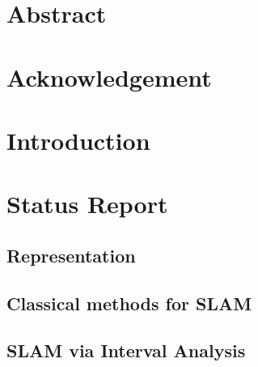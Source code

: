 \documentclass[12pt]{report} %
\begin{document}
\renewcommand{\contentsname}{Contents}	%
\renewcommand{\bibname}{Bibliography}	%




\chapter*{Abstract}

\tableofcontents  %


\chapter*{Acknowledgement}

\listoffigures  %
\chapter*{Introduction}

\chapter{Status Report}
\section{Representation}

\section{Classical methods for SLAM}

\section{SLAM via Interval Analysis}
\label{sec:slamIA}

\end{document}
